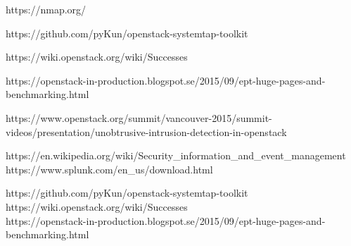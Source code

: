 \documentclass[12pt]{article}
\begin{document}
\begin{thebibliography}{1}

    https://nmap.org/

    https://github.com/pyKun/openstack-systemtap-toolkit

    https://wiki.openstack.org/wiki/Successes

    https://openstack-in-production.blogspot.se/2015/09/ept-huge-pages-and-benchmarking.html

    https://www.openstack.org/summit/vancouver-2015/summit-videos/presentation/unobtrusive-intrusion-detection-in-openstack

    https://en.wikipedia.org/wiki/Security\_information\_and\_event\_management
    \\
    https://www.splunk.com/en\_us/download.html

    https://github.com/pyKun/openstack-systemtap-toolkit
    \\
    https://wiki.openstack.org/wiki/Successes
    \\
    https://openstack-in-production.blogspot.se/2015/09/ept-huge-pages-and-benchmarking.html


\end{thebibliography}
\end{document}
